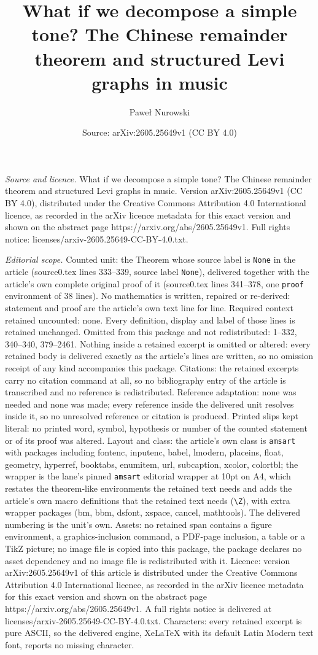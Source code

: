 \documentclass[10pt,a4paper]{amsart}
\title[What if we decompose a simple tone? The Chinese remainder th]{What if we decompose a simple tone? The Chinese remainder theorem and structured Levi graphs in music}
\author{Pawe{\l} Nurowski}
\date{Source: arXiv:2605.25649v1 (CC BY 4.0)}
\begin{document}
\maketitle

\noindent\emph{Source and licence.} What if we decompose a simple tone? The Chinese remainder theorem and structured Levi graphs in music. Version arXiv:2605.25649v1 (CC BY 4.0), distributed under the Creative Commons Attribution 4.0 International licence, as recorded in the arXiv licence metadata for this exact version and shown on the abstract page https://arxiv.org/abs/2605.25649v1. Full rights notice: licenses/arxiv-2605.25649-CC-BY-4.0.txt.\par\smallskip

\noindent\textit{Editorial scope.} Counted unit: the Theorem whose source label is \texttt{None} in the article (source0.tex lines 333--339, source label \texttt{None}), delivered together with the article's own complete original proof of it (source0.tex lines 341--378, one \texttt{proof} environment of 38 lines). No mathematics is written, repaired or re-derived: statement and proof are the article's own text line for line. Required context retained uncounted: none. Every definition, display and label of those lines is retained unchanged. Omitted from this package and not redistributed: 1--332, 340--340, 379--2461. Nothing inside a retained excerpt is omitted or altered: every retained body is delivered exactly as the article's lines are written, so no omission receipt of any kind accompanies this package. Citations: the retained excerpts carry no citation command at all, so no bibliography entry of the article is transcribed and no reference is redistributed. Reference adaptation: none was needed and none was made; every reference inside the delivered unit resolves inside it, so no unresolved reference or citation is produced. Printed slips kept literal: no printed word, symbol, hypothesis or number of the counted statement or of its proof was altered. Layout and class: the article's own class is \texttt{amsart} with packages including fontenc, inputenc, babel, lmodern, placeins, float, geometry, hyperref, booktabs, enumitem, url, subcaption, xcolor, colortbl; the wrapper is the lane's pinned \texttt{amsart} editorial wrapper at 10pt on A4, which restates the theorem-like environments the retained text needs and adds the article's own macro definitions that the retained text needs (\texttt{\textbackslash Z}), with extra wrapper packages (bm, bbm, dsfont, xspace, cancel, mathtools). The delivered numbering is the unit's own. Assets: no retained span contains a figure environment, a graphics-inclusion command, a PDF-page inclusion, a table or a TikZ picture; no image file is copied into this package, the package declares no asset dependency and no image file is redistributed with it. Licence: version arXiv:2605.25649v1 of this article is distributed under the Creative Commons Attribution 4.0 International licence, as recorded in the arXiv licence metadata for this exact version and shown on the abstract page https://arxiv.org/abs/2605.25649v1. A full rights notice is delivered at licenses/arxiv-2605.25649-CC-BY-4.0.txt. Characters: every retained excerpt is pure ASCII, so the delivered engine, XeLaTeX with its default Latin Modern text font, reports no missing character.
\end{document}
